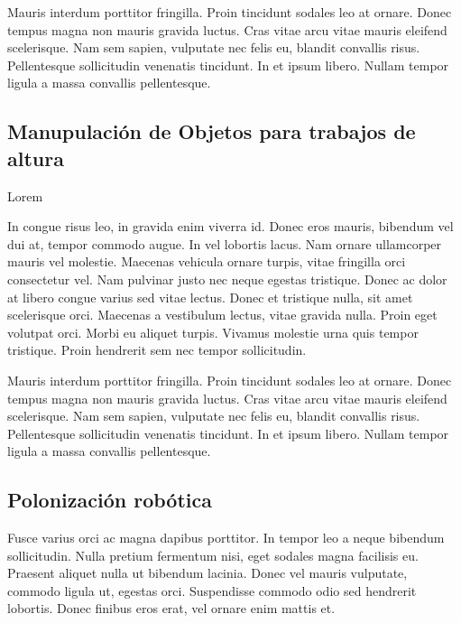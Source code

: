 \documentclass{article}
\begin{document}
Mauris interdum porttitor fringilla. Proin tincidunt sodales leo at ornare. Donec tempus magna non mauris gravida luctus. Cras vitae arcu vitae mauris eleifend scelerisque. Nam sem sapien, vulputate nec felis eu, blandit convallis risus. Pellentesque sollicitudin venenatis tincidunt. In et ipsum libero. Nullam tempor ligula a massa convallis pellentesque.

\subsection{Manupulación de Objetos para trabajos de altura}

Lorem

\begin{question}
  In congue risus leo, in gravida enim viverra id. Donec eros mauris, bibendum vel dui at, tempor commodo augue. In vel lobortis lacus. Nam ornare ullamcorper mauris vel molestie. Maecenas vehicula ornare turpis, vitae fringilla orci consectetur vel. Nam pulvinar justo nec neque egestas tristique. Donec ac dolor at libero congue varius sed vitae lectus. Donec et tristique nulla, sit amet scelerisque orci. Maecenas a vestibulum lectus, vitae gravida nulla. Proin eget volutpat orci. Morbi eu aliquet turpis. Vivamus molestie urna quis tempor tristique. Proin hendrerit sem nec tempor sollicitudin.
\end{question}

Mauris interdum porttitor fringilla. Proin tincidunt sodales leo at ornare. Donec tempus magna non mauris gravida luctus. Cras vitae arcu vitae mauris eleifend scelerisque. Nam sem sapien, vulputate nec felis eu, blandit convallis risus. Pellentesque sollicitudin venenatis tincidunt. In et ipsum libero. Nullam tempor ligula a massa convallis pellentesque.

\subsection{Polonización robótica}

Fusce varius orci ac magna dapibus porttitor. In tempor leo a neque bibendum sollicitudin. Nulla pretium fermentum nisi, eget sodales magna facilisis eu. Praesent aliquet nulla ut bibendum lacinia. Donec vel mauris vulputate, commodo ligula ut, egestas orci. Suspendisse commodo odio sed hendrerit lobortis. Donec finibus eros erat, vel ornare enim mattis et.
\end{document}
